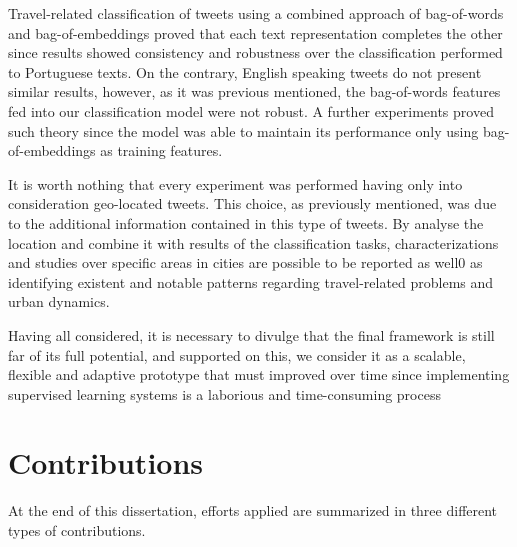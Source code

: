 Travel-related classification of tweets using a combined approach of bag-of-words and bag-of-embeddings proved that each text representation completes the other since results showed consistency and robustness over the classification performed to Portuguese texts. On the contrary, English speaking tweets do not present similar results, however, as it was previous mentioned, the bag-of-words features fed into our classification model were not robust. A further experiments proved such theory since the model was able to maintain its performance only using bag-of-embeddings as training features.

It is worth nothing that every experiment was performed having only into consideration geo-located tweets. This choice, as previously mentioned, was due to the additional information contained in this type of tweets. By analyse the location and combine it with results of the classification tasks, characterizations and studies over specific areas in cities are possible to be reported as well0 as identifying existent and notable patterns regarding travel-related problems and urban dynamics.

Having all considered, it is necessary to divulge that the final framework is still far of its full potential, and supported on this, we consider it as a scalable, flexible and adaptive prototype that must improved over time since implementing supervised learning systems is a laborious and time-consuming process

\section{Contributions}

At the end of this dissertation, efforts applied are summarized in three different types of contributions.

